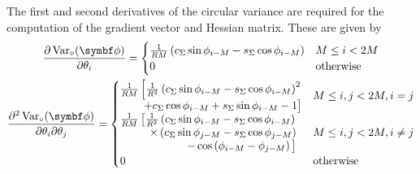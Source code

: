 The first and second derivatives of the circular variance are required for
the computation of the gradient vector and Hessian matrix. These are given by
\begin{subequations}
    \begin{gather}
        \frac{\partial \circvar}{\partial \theta_i} =
        \begin{cases}
            \frac{1}{RM}
            \left(
                c_{\Sigma} \sin \phi_{i-M} -
                s_{\Sigma} \cos \phi_{i-M}
            \right) & M \leq i < 2M\\
            0 & \text{otherwise}
        \end{cases}\\
        \frac{\partial^2 \circvar}{\partial \theta_i \partial \theta_j} =
        \begin{cases}
            \begin{split}
                \tfrac{1}{RM}\left[
                    \tfrac{1}{R^2}
                    \left(c_{\Sigma} \sin \phi_{i-M}  - s_{\Sigma} \cos \phi_{i-M} \right)^2 \right. \\
                    \left. + c_{\Sigma} \cos \phi_{i-M} + s_{\Sigma} \sin \phi_{i-M}
                    - 1
                \vphantom{\tfrac{1}{RM}}\right]
            \end{split}
            & M \leq i, j < 2M, i = j\\
            \begin{split}
                \tfrac{1}{RM}\left[
                    \tfrac{1}{R^2}
                    \left(c_{\Sigma} \sin \phi_{i-M} - s_{\Sigma} \cos \phi_{i-M} \right) \right.\\
                    \times \left(c_{\Sigma} \sin \phi_{j-M} - s_{\Sigma} \cos \phi_{j-M} \right) \\
                    \left. - \cos\left( \phi_{i-M} - \phi_{j-M} \right)
                    \vphantom{\tfrac{1}{R^2}}
                \right]
            \end{split}
            & M \leq i, j < 2M, i \neq j\\
            0 & \text{otherwise}
        \end{cases}
    \end{gather}
\end{subequations}


